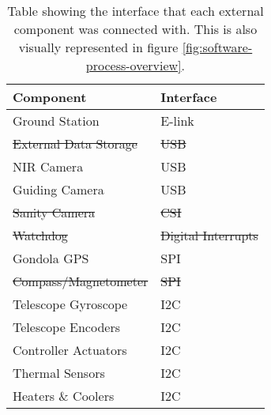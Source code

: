 \begin{table}[H]
	\centering
	\begin{tabular}{l|l}
		\textbf{Component}
		& \textbf{Interface} \\ \hline
		Ground Station
		& E-link             \\
		\st{External Data Storage}
		& \st{USB}            	 \\
		NIR Camera
		& USB                \\
		Guiding Camera
		& USB                \\
		\st{Sanity Camera}
		& \st{CSI}                \\
		\st{Watchdog}
		& \st{Digital Interrupts} \\
		Gondola GPS
		& SPI                \\
		\st{Compass/Magnetometer}
		& \st{SPI}                \\
		Telescope Gyroscope
		& I2C                \\
		Telescope Encoders
		& I2C                \\
		Controller Actuators
		& I2C                \\
		Thermal Sensors
		& I2C				 \\
		Heaters \& Coolers
		& I2C
	\end{tabular}
	\caption{Table showing the interface that each external component was connected with. This is also visually represented in figure \ref{fig:software-process-overview}.}
	\label{tab:software-interfaces}
\end{table}
